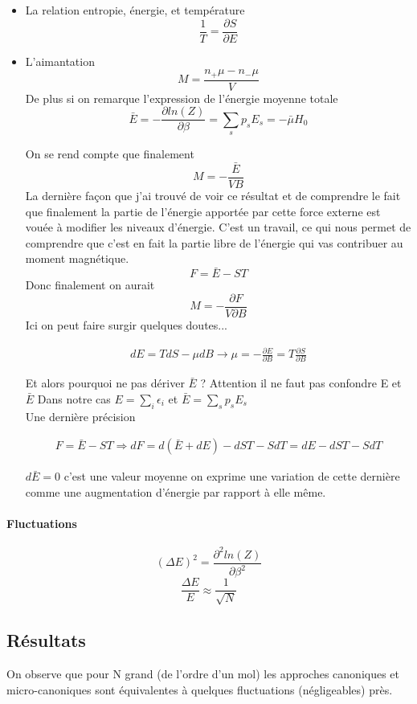 \begin{itemize}[label=]
	\item La relation entropie, énergie, et température
	\[
		 \frac{1}{T}=\frac{\partial S}{\partial E}
	\]
	\item L'aimantation
	\[
		M=\frac{n_+\mu - n_-\mu}{V}
	\]
	De plus si on remarque l'expression de l'énergie moyenne totale
	\[
		\bar{E}=-\frac{\partial ln(Z)}{\partial \beta}=\sum_sp_sE_s=-\bar{\mu}H_0
	\]

	On se rend compte que finalement 
	\[
		M=-\frac{\bar{E}}{V B}
	\]
	La dernière façon que j'ai trouvé de voir ce résultat et de comprendre le fait que finalement la partie de l'énergie apportée par cette force externe est vouée à modifier les niveaux d'énergie. C'est un travail, ce qui nous permet de comprendre que c'est en fait la partie libre de l'énergie qui vas contribuer au moment magnétique. \\ 
	\[
		F=\bar{E}-ST
	\]
	Donc finalement on aurait 
	\[
		M=-\frac{\partial F}{V\partial B}
	\]
	Ici on peut faire surgir quelques doutes... 

	\begin{align*}
		dE=TdS-\mu dB \rightarrow \mu=-\frac{\partial E}{\partial B}=T\frac{\partial S}{\partial B}
	\end{align*}

	Et alors pourquoi ne pas dériver $\bar{E}$ ? Attention il ne faut pas confondre E et $\bar{E}$
	Dans notre cas $E=\sum_i \epsilon_i$ et $\bar{E}=\sum_s p_s E_s$ \\
	Une dernière précision

	\begin{align*}
		F=\bar{E}-ST \Rightarrow dF=d(\bar{E} +dE)-dST-SdT =dE-dST-SdT  
	\end{align*}  

	$d\bar{E}=0$ c'est une valeur moyenne on exprime une variation de cette dernière comme une augmentation d'énergie par rapport à elle même.

\end{itemize}


\paragraph{Fluctuations}

\[
	(\Delta E)^2=\frac{\partial^2 ln(Z)}{\partial \beta^2}
\]
\[
	\frac{\Delta E}{E}\approx \frac{1}{\sqrt{N}}
\]


\subsection{Résultats}


On observe que pour N grand (de l'ordre d'un mol) les approches canoniques et micro-canoniques sont équivalentes à quelques fluctuations (négligeables) près.